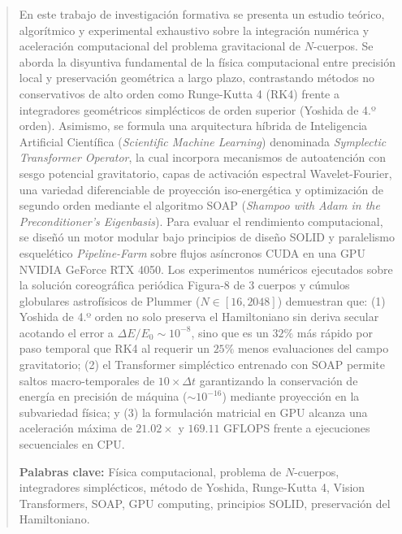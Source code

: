 \documentclass[11pt,a4paper]{article}
\begin{document}
\newpage
{}

\begin{abstract}
En este trabajo de investigación formativa se presenta un estudio teórico, algorítmico y experimental exhaustivo sobre la integración numérica y aceleración computacional del problema gravitacional de $N$-cuerpos. Se aborda la disyuntiva fundamental de la física computacional entre precisión local y preservación geométrica a largo plazo, contrastando métodos no conservativos de alto orden como Runge-Kutta 4 (RK4) frente a integradores geométricos simplécticos de orden superior (Yoshida de 4.º orden). Asimismo, se formula una arquitectura híbrida de Inteligencia Artificial Científica (\textit{Scientific Machine Learning}) denominada \textit{Symplectic Transformer Operator}, la cual incorpora mecanismos de autoatención con sesgo potencial gravitatorio, capas de activación espectral Wavelet-Fourier, una variedad diferenciable de proyección iso-energética y optimización de segundo orden mediante el algoritmo SOAP (\textit{Shampoo with Adam in the Preconditioner's Eigenbasis}). Para evaluar el rendimiento computacional, se diseñó un motor modular bajo principios de diseño SOLID y paralelismo esquelético \textit{Pipeline-Farm} sobre flujos asíncronos CUDA en una GPU NVIDIA GeForce RTX 4050. Los experimentos numéricos ejecutados sobre la solución coreográfica periódica Figura-8 de 3 cuerpos y cúmulos globulares astrofísicos de Plummer ($N \in [16, 2048]$) demuestran que: (1) Yoshida de 4.º orden no solo preserva el Hamiltoniano sin deriva secular acotando el error a $\Delta E/E_0 \sim 10^{-8}$, sino que es un $32\%$ más rápido por paso temporal que RK4 al requerir un $25\%$ menos evaluaciones del campo gravitatorio; (2) el Transformer simpléctico entrenado con SOAP permite saltos macro-temporales de $10\times \Delta t$ garantizando la conservación de energía en precisión de máquina ($\sim 10^{-16}$) mediante proyección en la subvariedad física; y (3) la formulación matricial en GPU alcanza una aceleración máxima de $21.02\times$ y $169.11$ GFLOPS frente a ejecuciones secuenciales en CPU.
\par\vspace{0.25cm}
\textbf{Palabras clave:} Física computacional, problema de $N$-cuerpos, integradores simplécticos, método de Yoshida, Runge-Kutta 4, Vision Transformers, SOAP, GPU computing, principios SOLID, preservación del Hamiltoniano.
\end{abstract}
\end{document}
